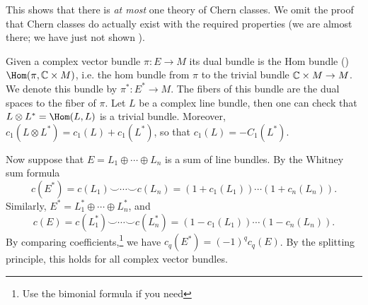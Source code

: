 \documentclass[ma3408.tex]{subfiles}
\begin{document}
\begin{Rem}
This shows that there is \emph{at most} one theory of Chern classes. We omit the proof that Chern classes do actually exist with the required properties (we are almost there; we have just not shown ). 
\end{Rem}
\begin{Exa}\label{exa:dual-bundle}
Given a complex vector bundle $\pi \colon E \to M$ its dual bundle is the Hom bundle () $\Hom(\pi,\bbC \times M)$, i.e. the hom bundle from $\pi$ to the trivial bundle $\mathbb{C} \times M \to M$. We denote this bundle by $\pi^* \colon E^* \to M$. The fibers of this bundle are the dual spaces to the fiber of $\pi$. Let $L$ be a complex line bundle, then one can check that $L \otimes L^* = \Hom(L,L)$ is a trivial bundle. Moreover, $c_1(L \otimes L^*) = c_1(L) + c_1(L^*)$, so that $c_1(L) = -C_1(L^*)$. 

Now suppose that   $E = L_1 \oplus \cdots \oplus L_n$ is a sum of line bundles. By the Whitney sum formula
\[
c(E^*) = c(L_1) \smile \cdots \smile c(L_n) = (1+c_1(L_1)) \cdots (1+c_n(L_n)).
\]
Similarly, $E^* = L_1^* \oplus \cdots \oplus L_n^*$, and
\[
c(E) = c(L_1^*) \smile \cdots \smile c(L_n^*) = (1-c_1(L_1)) \cdots (1-c_n(L_n)).
\]
By comparing coefficients,\footnote{Use the bimonial formula if you need} we have $c_q(E^*) = (-1)^qc_q(E)$. By the splitting principle, this holds for all complex vector bundles. 
\end{Exa}
\end{document}
